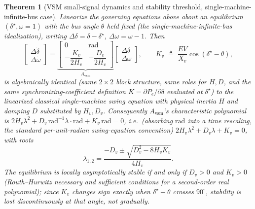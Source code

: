 \documentclass[11pt]{report}
\theoremstyle{plain}
\newtheorem{theorem}{Theorem}[chapter]
\theoremstyle{definition}
\theoremstyle{remark}
\begin{document}
\begin{theorem}[VSM small-signal dynamics and stability threshold, single-machine-infinite-bus case]
\label{thm:vsm}
Linearize the governing equations above about an equilibrium
$(\delta^\star,\omega=1)$ with the bus angle $\theta$ held fixed (the
single-machine-infinite-bus idealization), writing
$\Delta\delta=\delta-\delta^\star$, $\Delta\omega=\omega-1$. Then
\begin{equation}
\begin{bmatrix}\Delta\dot\delta\\\Delta\dot\omega\end{bmatrix}
= \underbrace{\begin{bmatrix}0 & \text{rad}\\ -\dfrac{K_v}{2H_v} & -\dfrac{D_v}{2H_v}\end{bmatrix}}_{A_{\text{vsm}}}
\begin{bmatrix}\Delta\delta\\\Delta\omega\end{bmatrix}, \qquad
K_v \;\triangleq\; \frac{EV}{X_v}\cos(\delta^\star-\theta),
\label{eq:vsm-linear}
\end{equation}
is \emph{algebraically identical} (same $2\times2$ block structure, same
roles for $H,D$, and the same synchronizing-coefficient definition
$K=\partial P_e/\partial\delta$ evaluated at $\delta^\star$) to the linearized
classical single-machine swing equation with physical inertia $H$ and
damping $D$ substituted by $H_v,D_v$. Consequently $A_{\text{vsm}}$'s
characteristic polynomial is
$2H_v\lambda^2+D_v\,\text{rad}^{-1}\lambda\cdot\text{rad}+K_v\,\text{rad}=0$,
i.e.\ (absorbing $\text{rad}$ into a time rescaling, the standard
per-unit-radian swing-equation convention)
$2H_v\lambda^2+D_v\lambda+K_v=0$, with roots
\begin{equation}
\lambda_{1,2} = \frac{-D_v\pm\sqrt{D_v^2-8H_vK_v}}{4H_v}.
\label{eq:vsm-eigs}
\end{equation}
The equilibrium is locally asymptotically stable if and only if
$D_v>0$ and $K_v>0$ (Routh--Hurwitz necessary and sufficient conditions
for a second-order real polynomial); since $K_v$ changes sign exactly
when $\delta^\star-\theta$ crosses $90^\circ$, stability is lost
\emph{discontinuously} at that angle, not gradually.
\end{theorem}
\end{document}
